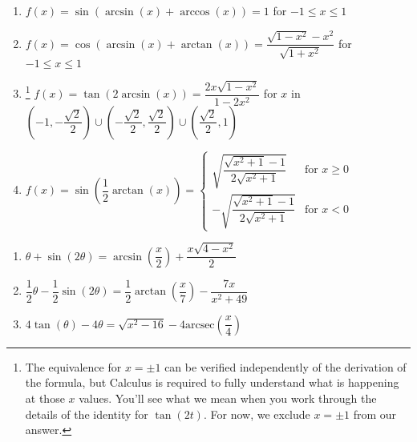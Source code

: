 \documentclass{ximera}
\begin{document}
\begin{enumerate}
\item $f(x) =\sin \left( \arcsin(x) + \arccos(x) \right) = 1$ for $-1 \leq x \leq 1$
\item $f(x) =\cos \left( \arcsin(x) + \arctan(x) \right) = \dfrac{\sqrt{1 - x^{2}} - x^{2}}{\sqrt{1 + x^{2}}}$ for $-1 \leq x \leq 1$
\item\!\!\footnote{The equivalence for $x = \pm 1$ can be verified independently of the derivation of the formula, but Calculus is required to fully understand what is happening at those $x$ values.  You'll see what we mean when you work through the details of the identity for $\tan(2t).$  For now, we exclude $x = \pm 1$ from our answer.} $f(x) =\tan \left( 2\arcsin(x) \right) = \dfrac{2x\sqrt{1 - x^{2}}}{1 - 2x^{2}}$ for $x$ in $\left(-1, -\dfrac{\sqrt{2}}{2}\right) \cup \left(-\dfrac{\sqrt{2}}{2}, \dfrac{\sqrt{2}}{2} \right) \cup \left(\dfrac{\sqrt{2}}{2}, 1\right)$
\item $f(x) =\sin \left( \dfrac{1}{2}\arctan(x) \right) = \left\{ \begin{array}{rr} \sqrt{\dfrac{\sqrt{x^{2} + 1} - 1}{2\sqrt{x^{2} + 1}}} & \text{for $x \geq 0$} \\ [10pt] -\sqrt{\dfrac{\sqrt{x^{2} + 1} - 1}{2\sqrt{x^{2} + 1}}} & \text{for $x < 0$}  \end{array}\right. $ 

\setcounter{HW}{\value{enumi}}

\end{enumerate}

\begin{enumerate}

\setcounter{enumi}{\value{HW}}

\item  $\theta + \sin(2\theta) = \arcsin \left( \dfrac{x}{2} \right) + \dfrac{x\sqrt{4 - x^{2}}}{2}$

\item  $\dfrac{1}{2}\theta - \dfrac{1}{2}\sin(2\theta) = \dfrac{1}{2} \arctan \left( \dfrac{x}{7} \right) - \dfrac{7x}{x^{2} + 49}$

\item   $4\tan(\theta) - 4\theta = \sqrt{x^{2} - 16} - 4\mbox{arcsec} \left( \dfrac{x}{4} \right)$

\setcounter{HW}{\value{enumi}}

\end{enumerate}
\end{document}
